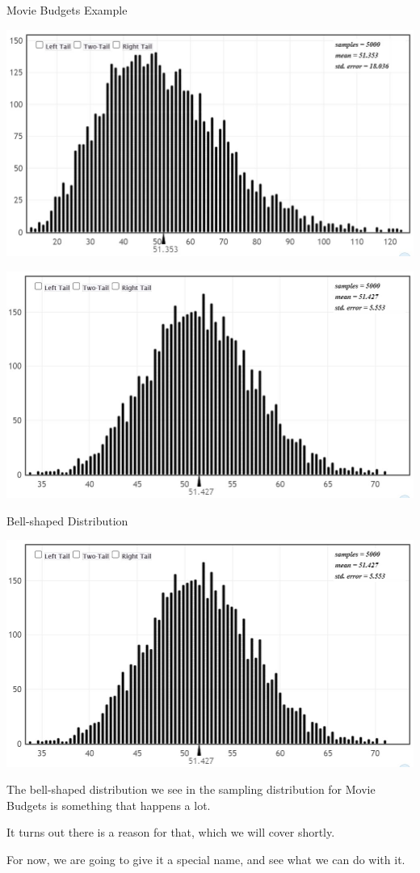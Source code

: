 \documentclass{beamer}
\begin{document}
\begin{frame}{Movie Budgets Example}
\begin{center}
    \includegraphics[scale=.4]{img/budgets_n10.jpg}
    
    \includegraphics[scale=.4]{img/budgets_n100.jpg}
\end{center}
\end{frame}

\begin{frame}{Bell-shaped Distribution}
\begin{center}
    \includegraphics[scale=.4]{img/budgets_n100.jpg}
\end{center}

The bell-shaped distribution we see in the sampling distribution for Movie Budgets is something that happens a lot. \vspace{6mm}

It turns out there is a reason for that, which we will cover shortly. \vspace{6mm}

For now, we are going to give it a special name, and see what we can do with it.
\end{frame}
\end{document}
